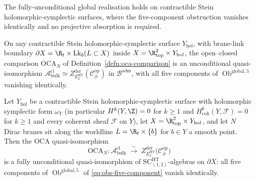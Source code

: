 The fully-unconditional global realisation holds on contractible
Stein holomorphic-symplectic surfaces, where the five-component
obstruction vanishes identically and no projective absorption is
required.

\begin{thm}
\label{thm:unconditional-global-contractible-HS}
On any contractible Stein holomorphic-symplectic surface
$Y_{\mathrm{hol}}$, with brane-link boundary
$\partial X=\R_t\times\mathrm{Lk}_b(L\subset X)$ inside
$X=\R^2_{\mathrm{top}}\times Y_{\mathrm{hol}}$, the open--closed
comparison $\mathrm{OCA}_N$ of
Definition~\ref{defn:oca-comparison} is an unconditional
quasi-isomorphism
$\mathcal A^{\mathrm{cl}}_{\mathrm{bulk}}\simeq
Z^{\mathrm{der}}_{E_2^{\mathrm{HT}}}(\mathcal C^{\mathrm{op}}_\partial)$
in $\mathcal B^{\mathrm{adm}}$, with all five components of
$\operatorname{Ob}^{\mathrm{global,5}}$ vanishing identically.

Let \(Y_{\mathrm{hol}}\) be a contractible Stein holomorphic-symplectic
surface with holomorphic symplectic form \(\omega_Y\) (in particular
\(H^k(Y,\Z)=0\) for \(k\geq 1\) and
\(H^k_{\mathrm{coh}}(Y,\mathcal F)=0\) for \(k\geq 1\) and every
coherent sheaf \(\mathcal F\) on \(Y\)), let
\(X=\R^2_{\mathrm{top}}\times Y_{\mathrm{hol}}\), and let \(N\) Dirac
branes sit along the worldline \(L=\R_t\times\{b\}\) for \(b\in Y\) a
smooth point.  Then the OCA quasi-isomorphism
\begin{equation}\label{eq:unconditional-contractible-OCA}
  \mathrm{OCA}_N\colon
    \mathcal A^{\mathrm{cl}}_{\mathrm{bulk}}
    \;\xrightarrow{\sim}\;
    Z^{\mathrm{der}}_{E_2^{\mathrm{HT}}}\!\bigl(
      \mathcal C^{\mathrm{op}}_\partial\bigr)
\end{equation}
is a fully unconditional quasi-isomorphism of
\(\mathrm{SC}^{\mathrm{HT}}_{(1,2)}\)-algebras on \(\partial X\): all
five components of \(\operatorname{Ob}^{\mathrm{global,5}}\) of
\eqref{eq:obs-five-component} vanish identically.
\end{thm}

